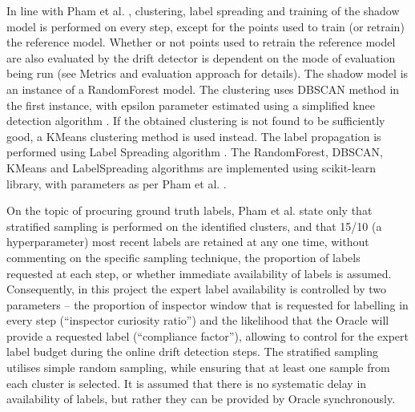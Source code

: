 \documentclass{svproc}
\begin{document}
In line with Pham et al. \cite{pham2025}, clustering, label spreading and training of the shadow model is performed on every step, except for the points used to train (or retrain) the reference model. Whether or not points used to retrain the reference model are also evaluated by the drift detector is dependent on the mode of evaluation being run (see Metrics and evaluation approach for details). The shadow model is an instance of a RandomForest model. The clustering uses DBSCAN method in the first instance, with epsilon parameter estimated using a simplified knee detection algorithm \cite{satopaa2011}. If the obtained clustering is not found to be sufficiently good, a KMeans clustering method is used instead. The label propagation is performed using Label Spreading algorithm \cite{bengio2004}. The RandomForest, DBSCAN, KMeans and LabelSpreading algorithms are implemented using scikit-learn library, with parameters as per Pham et al. \cite{pham2025}.

On the topic of procuring ground truth labels, Pham et al. \cite{pham2025} state only that stratified sampling is performed on the identified clusters, and that 15/10 (a hyperparameter) most recent labels are retained at any one time, without commenting on the specific sampling technique, the proportion of labels requested at each step, or whether immediate availability of labels is assumed. Consequently, in this project the expert label availability is controlled by two parameters – the proportion of inspector window that is requested for labelling in every step (“inspector curiosity ratio”) and the likelihood that the Oracle will provide a requested label (“compliance factor”), allowing to control for the expert label budget during the online drift detection steps. The stratified sampling utilises simple random sampling, while ensuring that at least one sample from each cluster is selected. It is assumed that there is no systematic delay in availability of labels, but rather they can be provided by Oracle synchronously. 
\end{document}
